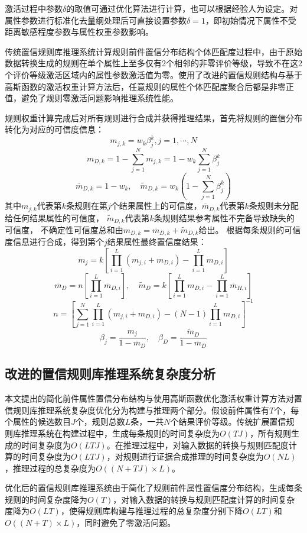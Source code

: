 \documentclass{cjc}
\begin{document}
激活过程中参数$\delta$的取值可通过优化算法进行计算，也可以根据经验人为设定。对属性参数进行标准化去量纲处理后可直接设置参数$\delta=1$，即初始情况下属性不受距离敏感程度参数与属性权重参数影响。

传统置信规则库推理系统计算规则前件置信分布结构个体匹配度过程中，由于原始数据转换生成的规则在单个属性上至多仅有2个相邻的非零评价等级，导致不在这2个评价等级激活区域内的属性参数激活值为零。使用了改进的置信规则结构与基于高斯函数的激活权重计算方法后，任意规则的属性个体匹配度聚合后都是非零正值，避免了规则零激活问题影响推理系统性能。

规则权重计算完成后对所有规则进行合成并获得推理结果，首先将规则的置信分布转化为对应的可信度信息：
$$m_{j,k}=w_k\beta_j^k,j=1,\cdots,N$$
$$m_{D,k}=1-\sum_{j=1}^Nm_{j,k}=1-w_k\sum_{j=1}^{N}\beta_j^k$$
$$\overline{m}_{D,k}=1-w_k,\quad\widetilde{m}_{D,k}=w_k(1-\sum_{j=1}^N\beta_j^k)$$
其中$m_{j,k}$代表第$k$条规则在第$j$个结果属性上的可信度，$\overline{m}_{D,k}$代表第$k$条规则未分配给任何结果属性的可信度，
$\widetilde{m}_{D,k}$代表第$k$条规则结果参考属性不完备导致缺失的可信度，
不确定性可信度总和由$m_{D,k}=\overline{m}_{D,k}+\widetilde{m}_{D,k}$给出。
根据每条规则的可信度信息进行合成，得到第个$j$结果属性最终置信度结果：
$$m_j=k[\prod_{i=1}^L(m_{j,i}+m_{D,i})-\prod_{i=1}^Lm_{D,i}]$$
$$\overline{m}_D=n[\prod_{i=1}^L\overline{m}_{D,i}],\quad\widetilde{m}_D=k[\prod_{i=1}^Lm_{D,i}-\prod_{i=1}^L\overline{m}_{H,i}]$$
$$n=[\sum_{j=1}^N\prod_{i=1}^L(m_{j,i}+m_{D,i})-(N-1)\prod_{i=1}^Lm_{D,i}]^{-1}$$
$$\beta_j=\frac{m_j}{1-\overline{m}_D},\quad\beta_D=\frac{\widetilde{m}_D}{1-\overline{m}_D}$$
\subsection{改进的置信规则库推理系统复杂度分析}
本文提出的简化前件属性置信分布结构与使用高斯函数优化激活权重计算方法对置信规则库推理系统复杂度优化分为构建与推理两个部分。假设前件属性有$T$个，每个属性的候选数目$J$个，规则总数$L$条，一共$N$个结果评价等级。传统扩展置信规则库推理系统在构建过程中，生成每条规则的时间复杂度为$O(TJ)$，所有规则生成的时间复杂度为$O(LTJ)$。在推理过程中，对输入数据的转换与规则匹配度计算的时间复杂度为$O(LTJ)$，对规则进行证据合成推理的时间复杂度为$O(NL)$，推理过程的总复杂度为$O((N+TJ)\times L)$。

优化后的置信规则库推理系统由于简化了规则前件属性置信度分布结构，生成每条规则的时间复杂度降为$O(T)$，对输入数据的转换与规则匹配度计算的时间复杂度降为$O(LT)$，使得规则库构建与推理过程的总复杂度分别下降$O(LT)$和$O((N+T)\times L)$，同时避免了零激活问题。
\end{document}
